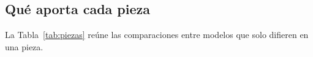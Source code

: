 \subsection{Qué aporta cada pieza}
\label{sec:piezas}
\label{sec:piezas-primer}
\suppressfloats[t]

La Tabla~\ref{tab:piezas} reúne las comparaciones entre modelos que
solo difieren en una pieza.


